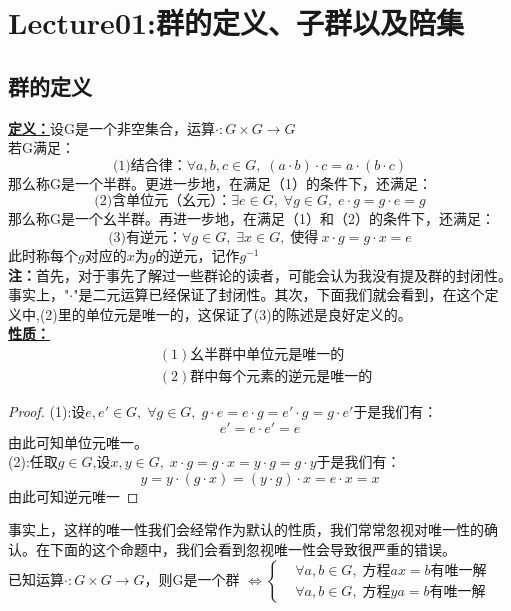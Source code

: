 \chapter*{Lecture01:群的定义、子群以及陪集}

\section{群的定义}

\textbf {\underline{定义：}}设G是一个非空集合，运算$\cdot \colon G \times G \to G$\\
若G满足：
\[
\text{(1)结合律：}\forall a,b,c\in G ,\; (a \cdot b)\cdot c = a \cdot (b \cdot c)
\]
那么称G是一个半群。更进一步地，在满足（1）的条件下，还满足：
\[
\text{(2)含单位元（幺元）：}\exists e \in G,\; \forall g \in G,\; e\cdot g=g\cdot e =g
\]
那么称G是一个幺半群。再进一步地，在满足（1）和（2）的条件下，还满足：
\[
\text{(3)有逆元：}\forall g \in G,\; \exists x \in G,\;\text{使得}\: x\cdot g =g\cdot x = e
\]
此时称每个$g$对应的$x$为$g$的逆元，记作$g^{-1}$\\
\textbf{注：}首先，对于事先了解过一些群论的读者，可能会认为我没有提及群的封闭性。事实上，"$\cdot$"是二元运算已经保证了封闭性。其次，下面我们就会看到，在这个定义中,(2)里的单位元是唯一的，这保证了(3)的陈述是良好定义的。\\
\textbf{\underline{性质：}}
\begin{align*}
&(1)\text{幺半群中单位元是唯一的}\\
&(2)\text{群中每个元素的逆元是唯一的}
\end{align*}
\begin{proof}
(1):\;设$e,e'\in G , \; \forall g\in G,\; g\cdot e =e \cdot g= e'\cdot g= g\cdot e'$于是我们有：
\[
e'=e\cdot e' =e
\]
由此可知单位元唯一。\\
(2):\;任取$g\in G$,设$x,y \in G, \; x\cdot g=g \cdot x= y\cdot g= g\cdot y$于是我们有：
\[
y=y\cdot (g\cdot x)=(y\cdot g)\cdot x=e\cdot x =x
\]
由此可知逆元唯一
\end{proof}
事实上，这样的唯一性我们会经常作为默认的性质，我们常常忽视对唯一性的确认。在下面的这个命题中，我们会看到忽视唯一性会导致很严重的错误。\\
已知运算$\cdot \colon G \times G \to G$，则G是一个群
$\iff
\left\{
\begin{aligned}
&\forall a,b\in G ,\; \text{方程}ax=b\text{有唯一解}\\
&\forall a,b\in G ,\; \text{方程}ya=b\text{有唯一解}
\end{aligned}\right.$\\
